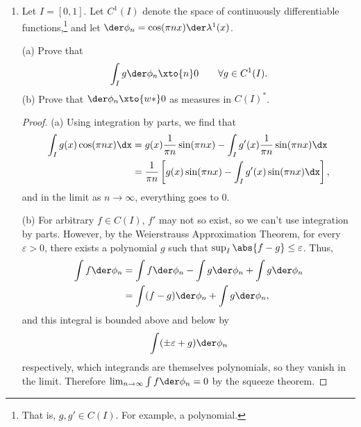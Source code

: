 \documentclass[12pt,letterpaper]{article}
\let\oldphi\phi
\renewcommand{\phi}{\varphi}
\renewcommand{\epsilon}{\varepsilon}
\begin{document}
\begin{enumerate}
\begin{proof}
\pagebreak
\textsc{Claim:} The sequence $\left(\lim_j\angles{\phi_j, u_n})\right)_{n=1}^\infty$ is a real Cauchy sequence, and thus converges. 

\textsc{Proof of claim:} Let $\epsilon >0$. Since $u_n\to x$, then it is also a Cauchy sequence, so there exists $N>0$ such that $\forall n,m>N$, 
$$\abs{u_n-u_m}<\epsilon$$
$$\implies \forall j \; \abs{\phi_j(u_n)-\phi_j(u_m)}=\abs{\phi_j(u_n-u_m)}\leq \norm{\phi_j}\epsilon$$
$$\implies \abs{\lim_j\phi_j(u_n)-\lim_j\phi_j(u_m)}\leq C\epsilon$$
so $\lim_n\lim_j\angles{\phi_j, u_n}=\lim_j\angles{\phi_j,x}$ converges for all $x\in X$, and we can define $\phi(x)=\lim_j\angles{\phi_j,x}$. Problem 3 assures us that $\phi\in X^*$, and we are done. 
\end{proof}

\renewcommand{\phi}{\oldphi}
\item Let $I=[0,1]$. Let $C^1(I)$ denote the space of continuously differentiable functions,\footnote{That is, $g,g'\in C(I)$. For example, a polynomial.} and \linebreak let $\der \phi_n=\cos(\pi nx)\der\lambda^1(x)$. 

(a) Prove that 
$$\int_Ig\der\phi_n\xto{n}0 \quad\quad\forall g\in C^1(I).$$
(b) Prove that $\der\phi_n\xto{w*}0$ as measures in $C(I)^*$. 

\begin{proof}(a) 
Using integration by parts, we find that 
\begin{align*}
\int_I g(x)\cos(\pi nx) \dx &= g(x)\frac{1}{\pi n}\sin(\pi nx) - \int_I g'(x)\frac{1}{\pi n}\sin(\pi nx)\dx \\
&= \frac{1}{\pi n}\left[g(x)\sin(\pi nx) - \int_I g'(x)\sin(\pi nx)\dx\right],
\end{align*}
and in the limit as $n\to \infty$, everything goes to 0. \qedwhite

(b) For arbitrary $f\in C(I)$, $f'$ may not so exist, so we can't use integration by parts. However, by the Weierstrauss Approximation Theorem, for every $\epsilon>0$, there exists a polynomial $g$ such that $\sup_I\abs{f-g}\leq\epsilon$. Thus, 
\begin{align*}
\int f \der\phi_n &= \int f\der\phi_n - \int g\der\phi_n + \int g\der\phi_n \\
&= \int (f-g)\der\phi_n + \int g\der\phi_n,
\end{align*}
and this integral is bounded above and below by 
$$\int (\pm \epsilon +g)\der\phi_n$$
respectively, which integrands are themselves polynomials, so they vanish in the limit. Therefore $\lim_{n\to\infty}\int f\der\phi_n=0$ by the squeeze theorem. 
\end{proof}

\end{enumerate}
\end{document}
